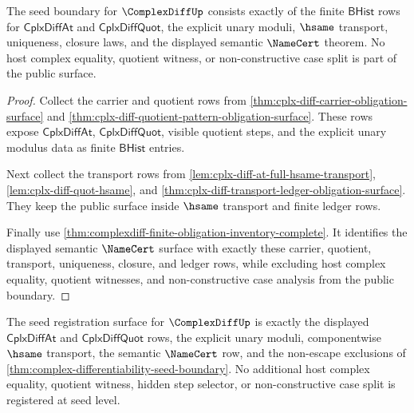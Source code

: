 \begin{theorem}
\label{thm:complex-differentiability-seed-boundary}
The seed boundary for $\ComplexDiffUp$ consists exactly of the finite
$\mathsf{BHist}$ rows for $\mathsf{CplxDiffAt}$ and
$\mathsf{CplxDiffQuot}$, the explicit unary moduli, $\hsame$ transport,
uniqueness, closure laws, and the displayed semantic $\NameCert$ theorem. No
host complex equality, quotient witness, or non-constructive case split is part
of the public surface.
\end{theorem}
\begin{proof}
Collect the carrier and quotient rows from
\autoref{thm:cplx-diff-carrier-obligation-surface} and
\autoref{thm:cplx-diff-quotient-pattern-obligation-surface}. These rows expose
$\mathsf{CplxDiffAt}$, $\mathsf{CplxDiffQuot}$, visible quotient steps, and the
explicit unary modulus data as finite $\mathsf{BHist}$ entries.

Next collect the transport rows from
\autoref{lem:cplx-diff-at-full-hsame-transport},
\autoref{lem:cplx-diff-quot-hsame}, and
\autoref{thm:cplx-diff-transport-ledger-obligation-surface}. They keep the
public surface inside $\hsame$ transport and finite ledger rows.

Finally use \autoref{thm:complexdiff-finite-obligation-inventory-complete}. It
identifies the displayed semantic $\NameCert$ surface with exactly these
carrier, quotient, transport, uniqueness, closure, and ledger rows, while
excluding host complex equality, quotient witnesses, and non-constructive case
analysis from the public boundary.
\end{proof}

\begin{theorem}
\label{thm:complex-differentiability-seed-closure-registration}
The seed registration surface for $\ComplexDiffUp$ is exactly the displayed
$\mathsf{CplxDiffAt}$ and $\mathsf{CplxDiffQuot}$ rows, the explicit unary
moduli, componentwise $\hsame$ transport, the semantic $\NameCert$ row, and the
non-escape exclusions of \autoref{thm:complex-differentiability-seed-boundary}.
No additional host complex equality, quotient witness, hidden step selector, or
non-constructive case split is registered at seed level.
\end{theorem}
